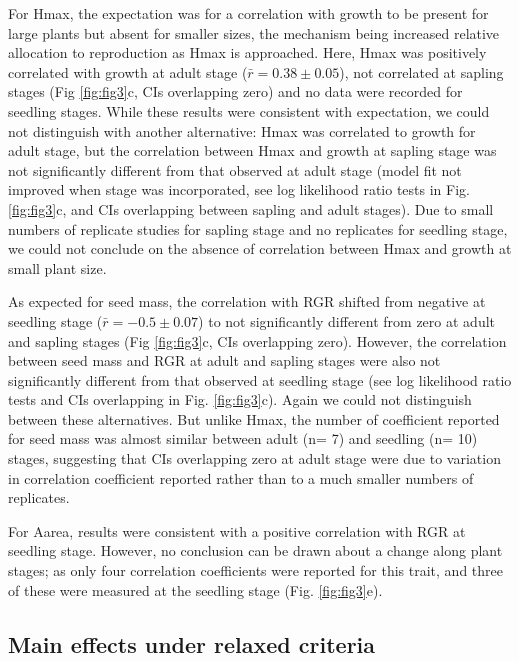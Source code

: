 \documentclass[a4paper,11pt]{article}
\begin{document}
For Hmax, the expectation was for a correlation with growth to be present for large plants but absent for smaller sizes, the mechanism being increased relative allocation to reproduction as Hmax is approached. Here, Hmax was positively correlated with growth at adult stage ($\bar{r}= 0.38 \pm 0.05$), not correlated at sapling stages (Fig \ref{fig:fig3}c, CIs overlapping zero) and no data were recorded for seedling stages. 
While these results were consistent with expectation, we could not distinguish with another alternative: Hmax was correlated to growth for adult stage, but the correlation between Hmax and growth at sapling stage was not significantly different from that observed at adult stage (model fit not improved when stage was incorporated, see log likelihood ratio tests in Fig. \ref{fig:fig3}c, and CIs overlapping between sapling and adult stages). Due to small numbers of replicate studies for sapling stage and no replicates for seedling stage, we could not conclude on the absence of correlation between Hmax and growth at small plant size.

As expected for seed mass, the correlation with RGR shifted from negative at seedling stage ($\bar{r}= -0.5 \pm 0.07$) to not significantly different from zero at adult and sapling stages (Fig \ref{fig:fig3}c, CIs overlapping zero). However, the correlation between seed mass and RGR at adult and sapling stages were also not significantly different from that observed at seedling stage (see log likelihood ratio tests and CIs overlapping in Fig. \ref{fig:fig3}c). Again we could not distinguish between these alternatives. But unlike Hmax, the number of coefficient reported for seed mass was almost similar between adult (n= 7) and seedling (n= 10) stages, suggesting that CIs overlapping zero at adult stage were due to variation in correlation coefficient reported rather than to a much smaller numbers of replicates.

For Aarea, results were consistent with a positive correlation with RGR at seedling stage. However, no conclusion can be drawn about a change along plant stages; as only four correlation coefficients were reported for this trait, and three of these were measured at the seedling stage (Fig. \ref{fig:fig3}e).


\subsection*{Main effects under relaxed criteria}
\end{document}
